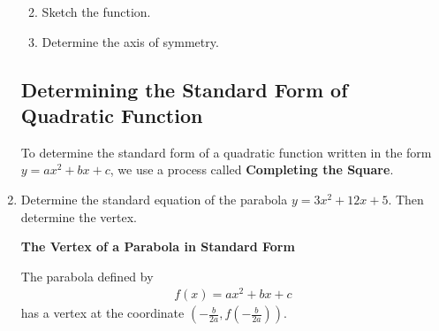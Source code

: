 \begin{enumerate}
\begin{enumerate}
\clearpage

\item Sketch the function.



\item Determine the axis of symmetry.\\



\end{enumerate}






\newpage



\subsection{Determining the Standard Form of Quadratic Function}

\noindent To determine the standard form of a quadratic function written in the form $y=ax^2+bx+c$, we use a process called \textbf{Completing the Square}.


 
 \item Determine the standard equation of the parabola $y=3x^2+12x+5$.  Then determine the vertex.
 
 
 \vfill
 
  
 \noindent\colorbox{blue!10}{%
   \parbox{\dimexpr\linewidth}%
   {%
     \textbf{The Vertex of a Parabola in Standard Form}

     The parabola defined by
     \begin{eqnarray*}
       f(x)=ax^2+bx+c
     \end{eqnarray*}
     has a vertex at the coordinate $\displaystyle \left(-\frac{b}{2a},f\left(-\frac{b}{2a}\right)\right)$.
   }
 }





\end{enumerate}

